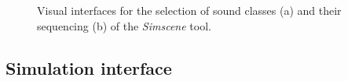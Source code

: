 \documentclass[twoside,twocolumn]{article}
\begin{document}
\begin{figure}[t]
        \myfloatalign
         \par
       \caption{Visual interfaces for the selection of sound classes (a) and their sequencing (b) of the \emph{Simscene} tool.}
\end{figure}

\subsection{Simulation interface}

\end{document}
